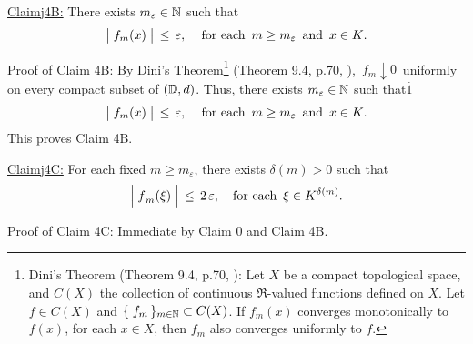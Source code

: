 \vskip 0.8cm
\begin{center}\begin{minipage}{6.5in}
\underline{Claim{{\color{white}j}}4B:}\;\;
There exists $m_{\varepsilon} \in \mathbb{N}$ such that
\begin{equation*}
\left\vert\;f_{m}(\overset{{\color{white}.}}{x})\;\right\vert \,\leq\, \varepsilon,\,
\quad
\textnormal{for each \,$m \geq m_{\varepsilon}$\, and \,$x \in K$}.
\end{equation*}
\end{minipage}\end{center}
Proof of Claim 4B:\;\;
By Dini's Theorem\footnote{Dini's Theorem (Theorem 9.4, p.70, \cite{Aliprantis1998}):\;
Let $X$ be a compact topological space, and $C(X)$ the collection of continuous $\Re$-valued
functions defined on $X$. Let $f \in C(X)$ and $\{\;f_{m}\,\}_{m\in\mathbb{N}} \subset C(X)$.
If $f_{m}(x)$ converges monotonically to $f(x)$, for each $x \in X$,
then $f_{m}$ also converges uniformly to $f$.} (Theorem 9.4, p.70, \cite{Aliprantis1998}),
\,$f_{m} \downarrow 0$\, uniformly on every compact subset of $(\mathbb{D},d)$.
Thus, there exists $m_{\varepsilon} \in \mathbb{N}$ such that{\color{white}$\overset{.}{1}$}
\begin{equation*}
\left\vert\;f_{m}(\overset{{\color{white}.}}{x})\;\right\vert \,\leq\, \varepsilon,\,
\quad\textnormal{for each \,$m \geq m_{\varepsilon}$\, and \,$x \in K$}.
\end{equation*}
This proves Claim 4B.

\vskip 0.8cm
\begin{center}\begin{minipage}{6.5in}
\underline{Claim{{\color{white}j}}4C:}\;\;
For each fixed $m \geq m_{\varepsilon}$, there exists $\delta(m) > 0$ such that
\begin{equation*}
\left\vert\;\overset{{\color{white}.}}{f}_{m}(\xi)\;\right\vert \,\leq\,  2\,\varepsilon,
\quad
\textnormal{for each \,$\xi \in K^{\delta(m)}$}.
\end{equation*}
\end{minipage}\end{center}
Proof of Claim 4C:\;\;
Immediate by Claim 0 and Claim 4B.

